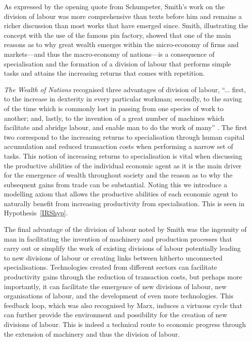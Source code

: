 As expressed by the opening quote from Schumpeter, Smith's work on the division of labour was more comprehensive than texts before him and remains a richer discussion than most works that have emerged since. Smith, illustrating the concept with the use of the famous pin factory, showed that one of the main reasons as to why great wealth emerges within the micro-economy of firms and markets---and thus the macro-economy of nations---is a consequence of specialisation and the formation of a division of labour that performs simple tasks and attains the increasing returns that comes with repetition.

\emph{The Wealth of Nations} recognised three advantages of division of labour, ``... first, to the increase in dexterity in every particular workman; secondly, to the saving of the time which is commonly lost in passing from one species of work to another; and, lastly, to the invention of a great number of machines which facilitate and abridge labour, and enable man to do the work of many'' \citep[p.~7]{Smith1776}. The first two correspond to the increasing returns to specialisation through human capital accumulation and reduced transaction costs when performing a narrow set of tasks. This notion of increasing returns to specialisation is vital when discussing the productive abilities of the individual economic agent as it is the main driver for the emergence of wealth throughout society and the reason as to why the subsequent gains from trade can be substantial. Noting this we introduce a modelling axiom that allows the productive abilities of each economic agent to naturally benefit from increasing productivity from specialisation. This is seen in Hypothesis~\ref{IRShyp}.

The final advantage of the division of labour noted by Smith was the ingenuity of man in facilitating the invention of machinery and production processes that carry out or simplify the work of existing divisions of labour potentially leading to new divisions of labour or creating links between hitherto unconnected specialisations. Technologies created from different sectors can facilitate productivity gains through the reduction of transaction costs, but perhaps more importantly, it can facilitate the emergence of new divisions of labour, new organisations of labour, and the development of even more technologies. This feedback loop, which was also recognised by Marx, induces a virtuous cycle that can further provide the environment and possibility for the creation of new divisions of labour. This is indeed a technical route to economic progress through the extension of machinery and thus the division of labour.

